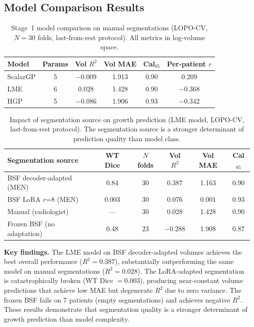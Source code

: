 \subsection{Model Comparison Results}
\label{sec:eval:comparison}

\begin{table}[H]
  \centering
  \caption{Stage~1 model comparison on manual segmentations (LOPO-CV, $N=30$ folds,
    last-from-rest protocol). All metrics in log-volume space.}
  \label{tab:stage1_comparison}
  \begin{tabular}{lccccc}
    \toprule
    \textbf{Model} & \textbf{Params} & \textbf{Vol $R^2$} &
      \textbf{Vol MAE} & \textbf{Cal$_{95}$} &
      \textbf{Per-patient $r$} \\
    \midrule
    ScalarGP & 5   & $-0.009$ & 1.913 & 0.90 & 0.209 \\
    LME      & 6   & $\mathbf{0.028}$ & 1.428 & 0.90 & $-0.368$ \\
    HGP      & 5   & $-0.086$ & 1.906 & 0.93 & $-0.342$ \\
    \bottomrule
  \end{tabular}
\end{table}

\begin{table}[H]
  \centering
  \caption{Impact of segmentation source on growth prediction (LME model,
    LOPO-CV, last-from-rest protocol). The segmentation source is a stronger
    determinant of prediction quality than model class.}
  \label{tab:segmentation_source_comparison}
  \begin{tabular}{lccccc}
    \toprule
    \textbf{Segmentation source} & \textbf{WT Dice} & \textbf{$N$ folds} &
      \textbf{Vol $R^2$} & \textbf{Vol MAE} & \textbf{Cal$_{95}$} \\
    \midrule
    BSF decoder-adapted (MEN) & 0.84 & 30 & $\mathbf{0.387}$ & 1.163 & 0.90 \\
    BSF LoRA $r$=8 (MEN) & 0.003 & 30 & 0.076 & 0.001 & 0.93 \\
    Manual (radiologist) & --- & 30 & 0.028 & 1.428 & 0.90 \\
    Frozen BSF (no adaptation) & 0.48 & 23 & $-0.288$ & 1.908 & 0.87 \\
    \bottomrule
  \end{tabular}
\end{table}

\noindent \textbf{Key findings.}
The LME model on BSF decoder-adapted volumes achieves the best overall performance
($R^2 = 0.387$), substantially outperforming the same model on manual segmentations
($R^2 = 0.028$). The LoRA-adapted segmentation is catastrophically broken (WT Dice
$= 0.003$), producing near-constant volume predictions that achieve low MAE but
degenerate $R^2$ due to zero variance. The frozen BSF fails on 7 patients (empty
segmentations) and achieves negative $R^2$. These results demonstrate that
segmentation quality is a stronger determinant of growth prediction than model
complexity.

